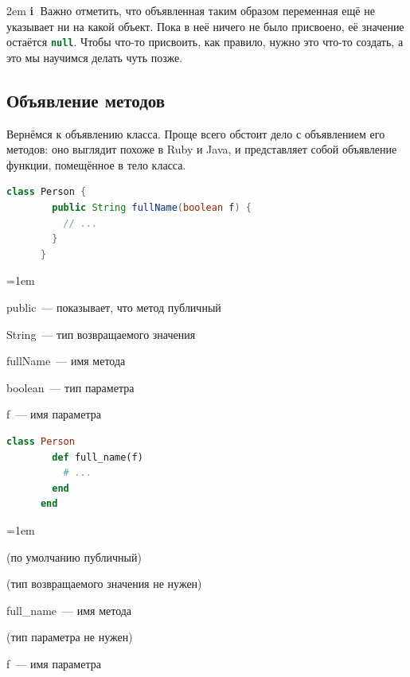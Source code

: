 \documentclass[a4paper, 14pt, titlepage]{extarticle}
\newenvironment{indented}%
    { \begingroup %
        \noindent %
        \leftskip2em %
        \rightskip\leftskip }%
    { \par\endgroup }
\newenvironment{extrainfo}%
    { \begin{indented} %
        \color{dkblue} %
        \small %
        \textbf{\textcircled{\footnotesize i}} }%
    { \end{indented} }
\newenvironment{halfpage}%
    {\noindent\begin{minipage}[h]{0.49\linewidth}} %
    {\end{minipage}\hfill}
\newcommand{\inlinecode}[2][Java]{\lstinline[basicstyle=\ttfamily, language=#1]{#2}}
\newenvironment{compactitemize} %
    {\begin{list}{\labelitemi}{\leftmargin=1em}}%
    {\end{list}}
\begin{document}
  \begin{extrainfo}
    Важно отметить, что объявленная таким образом переменная ещё не указывает ни на какой объект. Пока
    в неё ничего не было присвоено, её значение остаётся \inlinecode[Java]{null}. Чтобы что-то
    присвоить, как правило, нужно это что-то создать, а это мы научимся делать чуть позже.
  \end{extrainfo}

  \subsection{Объявление методов}

  Вернёмся к объявлению класса. Проще всего обстоит дело с объявлением его методов: оно выглядит
  похоже в Ruby и Java, и представляет собой объявление функции, помещённое в тело класса.

  \begin{halfpage}
    \begin{lstlisting}[language=Java, title={Метод в Java}, gobble=6, texcl]
      class Person {
        public String fullName(boolean f) {
          // ...
        }
      }
    \end{lstlisting}
    \footnotesize
    \begin{compactitemize}
      \item public~--- показывает, что метод публичный
      \item String~--- тип возвращаемого значения
      \item fullName~--- имя метода
      \item boolean~--- тип параметра
      \item f~--- имя параметра
    \end{compactitemize}
  \end{halfpage}
  \begin{halfpage}
    \begin{lstlisting}[language=Ruby, title={Метод в Ruby}, gobble=6, texcl]
      class Person
        def full_name(f)
          # ...
        end
      end
    \end{lstlisting}
    \footnotesize
    \begin{compactitemize}
      \item (по умолчанию публичный)
      \item (тип возвращаемого значения не нужен)
      \item full\_name~--- имя метода
      \item (тип параметра не нужен)
      \item f~--- имя параметра
    \end{compactitemize}
  \end{halfpage}
  \vspace{5mm} %
\end{document}
